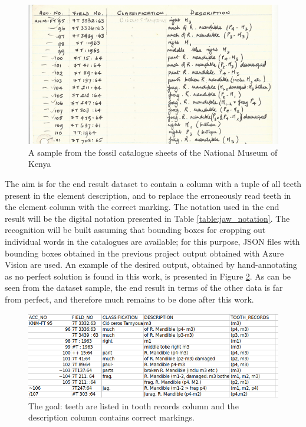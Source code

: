 \documentclass{article}
\begin{document}
\begin{figure}[h]
    \centering
    \includegraphics*[scale=0.5]{../images/cataloguesample3.png}
    \caption{A sample from the fossil catalogue sheets of the National Museum of Kenya}
    \label{image:cataloguesample}
\end{figure}

The aim is for the end result dataset to contain a column with a tuple of all teeth present in the 
element description, and to replace the erroneously read teeth in the element column with the correct 
marking. The notation used in the end result will be the digital notation presented in Table \ref{table:jaw_notation}.
The recognition will be built assuming that bounding boxes for cropping out individual words in the 
catalogues are available; for this purpose, JSON files with bounding boxes obtained in the 
previous project output obtained with Azure Vision are used. An example of the desired output, 
obtained by hand-annotating as no perfect solution is found in this work, is presented in Figure \ref{image:goal}. 
As can be seen from the dataset sample, the end result in terms of the other data is far from perfect, and 
therefore much remains to be done after this work.

\begin{figure}[h]
    \centering
    \includegraphics*[scale=0.5]{../images/goal.png}
    \caption{The goal: teeth are listed in tooth records column and the description column contains correct markings.}
    \label{image:goal}
\end{figure}
\end{document}
